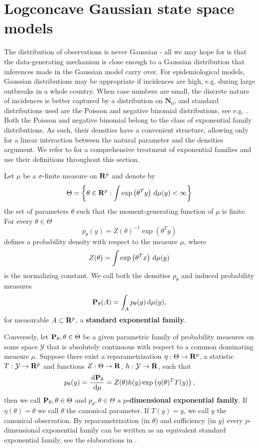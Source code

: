 \section{Logconcave Gaussian state space models}
\label{sec:logconcave_gaussian_state_space_models}

The distribution of observations is never Gaussian - all we may hope for is that the data-generating mechanism is close enough to a Gaussian distribution that inferences made in the Gaussian model carry over.
For epidemiological models, Gaussian distributions may be appropriate if incidences are high, e.g. during large outbreaks in a whole country. 
When case numbers are small, the discrete nature of incidences is better captured by a distribution on $\mathbf N_{0}$, and standard distributions used are the Poisson and negative binomial distributions, see e.g. \cite{Lloyd-Smith2005Superspreadinga}.
Both the Poisson and negative binomial belong to the class of exponential family distributions. As such, their densities have a convenient structure, allowing only for a linear interaction between the natural parameter and the densities argument. We refer to \cite{Brown1986Fundamentals} for a comprehensive treatment of exponential families and use their definitions throughout this section.

\begin{definition}
    Let $\mu$ be a $\sigma$-finite measure on $\R^{p}$ and denote by 
    $$\Theta = \left\{\theta \in \R^{p} : \int \exp \left( \theta^{T} y \right) \d\mu(y) < \infty\right\}$$
    the set of parameters $\theta$ such that the moment-generating function of $\mu$ is finite. 
    For every $\theta \in \Theta$ $$p_{\theta}(y) = Z(\theta)^{-1} \exp (\theta^{T} y)$$ defines a probability density with respect to the measure $\mu$, where $$Z(\theta) = \int \exp \left( \theta^{T} x \right) \d\mu(y)$$ is the normalizing constant. 
    We call both the densities $p_{\theta}$ and induced probability measures $$ \P_{\theta} (A) = \int_{A} p_{\theta}(y) \d \mu(y),$$ for measurable $A \subset \R^{p}$, a \textbf{standard exponential family}.

    Conversely, let $\P_{\theta}, \theta \in \Theta$ be a given parametric family of probability measures on some space $\mathcal Y$ that is absolutely continuous with respect to a common dominating measure $\mu$. Suppose there exist a reparametrization $\eta : \Theta \to \R^{p}$, a statistic $T: \mathcal Y \to \R^{p}$ and functions $Z: \Theta\to \R$, $h:\mathcal Y \to \R$, such that
    $$
        p_{\theta}(y) = \frac{\d \P_{\theta}}{\d \mu} = Z(\theta) h(y) \exp \left(\eta(\theta)^{T}T(y)\right),
    $$
    then we call $\P_{\theta}, \theta \in \Theta$ and $p_{\theta}, \theta \in \Theta$ a \textbf{$p$-dimensional exponential family}. If $\eta(\theta) = \theta$ we call $\theta$ the canonical parameter. If $T(y) = y$, we call $y$ the canonical observation. By reparametrization (in $\theta$) and sufficiency (in $y$) every $p$-dimensional exponential family can be written as an equivalent standard exponential family, see the elaborations in \cite[Chapter 1]{Brown1986Fundamentals}.
\end{definition}

